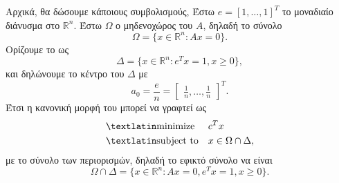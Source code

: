 Αρχικά, θα δώσουμε κάποιους συμβολισμούς, Έστω \( e = [1, \dots, 1]^T \) το
μοναδιαίο διάνυσμα στο \( \mathbb{R}^n \). Έστω \( \Omega \) ο μηδενοχώρος του
\(A\), δηλαδή το σύνολο
\begin{equation*}
    \Omega = \{ x \in \mathbb{R}^n: Ax = 0\}.
\end{equation*}
Ορίζουμε το  ως
\begin{equation*}
    \Delta = \{ x \in \mathbb{R}^n: e^Tx = 1, x \geq 0\},
\end{equation*}
και δηλώνουμε το κέντρο του  \(\Delta \) με
\begin{equation*}
    a_0 = \frac{e}{n} = \begin{bmatrix}
        \frac{1}{n}, \dots, \frac{1}{n}
    \end{bmatrix}^T.
\end{equation*}
Έτσι η κανονική μορφή του  μπορεί να γραφτεί ως
\begin{equation}\label{eq:ip_kar_can}
    \begin{aligned}
        & {\text{\tl{minimize}}}
        & & c^T x \\
        & \text{\tl{subject to}}
        & & x \in \Omega \cap \Delta,
    \end{aligned}
\end{equation}
με το σύνολο των περιορισμών, δηλαδή το εφικτό σύνολο να είναι
\begin{equation*}
    \Omega \cap \Delta = \{ x \in \mathbb{R}^n: Ax = 0, e^Tx = 1, x \geq 0 \}.
\end{equation*}

